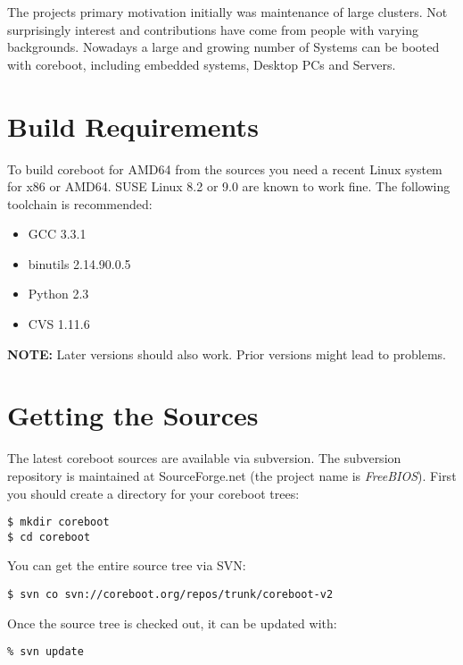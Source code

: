 \documentclass[titlepage,12pt]{article}
\begin{document}
The projects primary motivation initially was maintenance of large
clusters. Not surprisingly interest and contributions have come from
people with varying backgrounds.  Nowadays a large and growing number of
Systems can be booted with coreboot, including embedded systems,
Desktop PCs and Servers.

%
%

\section{Build Requirements}
To build coreboot for AMD64 from the sources you need a recent Linux
system for x86 or AMD64. SUSE Linux 8.2 or 9.0 are known to work fine.
The following toolchain is recommended:

 \begin{itemize}
 \item GCC 3.3.1
 \item binutils 2.14.90.0.5
 \item Python 2.3
 \item CVS 1.11.6
 \end{itemize}

\textbf{NOTE:} Later versions should also work. Prior versions might lead to problems.

\newpage

%
%

\section{Getting the Sources}

The latest coreboot sources are available via subversion. The subversion
repository is maintained at SourceForge.net (the project name is
\emph{FreeBIOS}).  First you should create a directory for your
coreboot trees:

{ \small
\begin{verbatim}
$ mkdir coreboot
$ cd coreboot
\end{verbatim}
}

You can get the entire source tree via SVN:

{ \small 
\begin{verbatim}
$ svn co svn://coreboot.org/repos/trunk/coreboot-v2
\end{verbatim}
}

Once the source tree is checked out, it can be updated with:

{ \small
\begin{verbatim}
% svn update
\end{verbatim}
}
\end{document}

